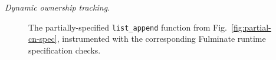 \emph{Dynamic ownership tracking.}

\begin{figure}[h]
    \begin{center}
    
    \end{center}
    \caption{The partially-specified \texttt{list\_append} function from Fig.~\ref{fig:partial-cn-spec}, instrumented with the corresponding Fulminate runtime specification checks.}
    \label{fig:partial-fulm-spec}
\end{figure}


\newpage





